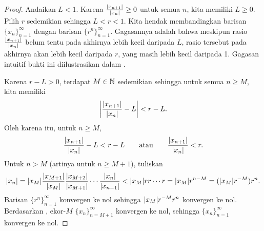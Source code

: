 \begin{proof}
Andaikan $L < 1$.
Karena
$\frac{\lvert {x_{n+1}} \rvert}{\lvert {x_n} \rvert} \geq 0$ untuk semua $n$, kita memiliki $L \geq 0$.  Pilih
$r$ sedemikian sehingga $L < r < 1$.
Kita hendak membandingkan barisan $\{ x_n \}_{n=1}^\infty$ dengan barisan $\{ r^n \}_{n=1}^\infty$.  Gagasannya adalah bahwa
meskipun rasio $\frac{\sabs{x_{n+1}}}{\sabs{x_n}}$ belum tentu pada akhirnya lebih kecil daripada $L$,
rasio tersebut pada akhirnya akan lebih kecil daripada $r$, yang masih lebih kecil daripada 1.
Gagasan intuitif bukti ini diilustrasikan dalam .
\begin{myfigureht}
\caption{Garis-garis pendek menyatakan rasio
$\frac{\sabs{x_{n+1}}}{\sabs{x_n}}$
yang mendekati $L < 1$.\label{figratseq}}
\end{myfigureht}

Karena $r-L > 0$, terdapat $M \in {\mathbb{N}}$ sedemikian sehingga untuk
semua $n \geq M$, kita memiliki
\begin{equation*}
\left\lvert {\frac{\lvert {x_{n+1}} \rvert}{\lvert {x_n} \rvert} - L} \right\rvert < r-L .
\end{equation*}
Oleh karena itu, untuk $n \geq M$,
\begin{equation*}
\frac{\lvert {x_{n+1}} \rvert}{\lvert {x_n} \rvert} - L < r-L 
\qquad \text{atau} \qquad
\frac{\lvert {x_{n+1}} \rvert}{\lvert {x_n} \rvert} < r .
\end{equation*}
Untuk $n > M$ (artinya untuk $n \geq M+1$),
tuliskan
\begin{equation*}
\lvert {x_n} \rvert =
\lvert {x_M} \rvert
\frac{\lvert {x_{M+1}} \rvert}{\lvert {x_{M}} \rvert}
\frac{\lvert {x_{M+2}} \rvert}{\lvert {x_{M+1}} \rvert}
\cdots
\frac{\lvert {x_{n}} \rvert}{\lvert {x_{n-1}} \rvert}
<
\lvert {x_M} \rvert
r r \cdots r = \lvert {x_M} \rvert r^{n-M} = (\lvert {x_M} \rvert r^{-M}) r^n .
\end{equation*}
Barisan $\{ r^n \}_{n=1}^\infty$ konvergen ke nol sehingga
$\lvert {x_M} \rvert r^{-M} r^n$ konvergen ke nol.  Berdasarkan ,
ekor-$M$
$\{x_n\}_{n=M+1}^\infty$ konvergen ke nol, sehingga $\{x_n\}_{n=1}^\infty$ konvergen ke nol.


\end{proof}
